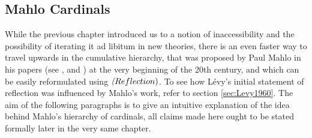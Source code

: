 \documentclass[12pt,a4paper]{article}
\newcommand{\power}[1]{\ensuremath{\mathscr{P}} (#1)}
\newcommand{\then}{\rightarrow}
\begin{document}
{\begin{comment}
Then $\langle$
 $V_ \alpha, \in, R  \cap V_\alpha \rangle \prec \langle V_{\kappa}, \in, R\rangle$ by the usual (Tarski) criterion for elementary substructure.
 \newline\newline
 The next part, proving $(iii) \then (ii)$, should be elementary since $C$ is closed unbounded, which means that it contains at least countably many elements but we need only one such $\alpha$ to satisfy (\ref{def:reflection_2}).
 \newline
 Finally, we shall prove that $(ii) \then (i)$. Since it obviously holds that $\kappa > \omega$, we have yet to prove that $\kappa$ is regular and a~strong limit. Let's argue by contradiction that it is regular. 
 If it wasn't, there would be a~$\beta < \kappa$ and a~function $F: \beta \implies \kappa$ with range unbounded in $\kappa$. Set $R = \{\beta\} \cup F$. By hypothesis there is an $\alpha < \kappa$ such that $\langle V_\alpha, \in, R \cap V_\alpha \rangle \prec \langle V_\kappa, \in, R \rangle$. Since $\beta$ is the single ordinal in R, $\beta \in V_\alpha$ by elementarity. This yields the desired contradiction since the domain if $F \cap V_\alpha$ cannot be all of $\beta$.
 \newline\newline
 Next, let's see whether $\kappa$ is indeed a~strong limit, again by contradiction. If not, there would be a~$\lambda < \kappa$ such that $2^\lambda \geq \kappa$. Let $G: \power{\lambda} \implies \kappa$ be surjective and set $R = \{\lambda + 1\} \cup G$. By hypothesis, there is an $\alpha < \kappa$ such that $\langle V_\alpha, \in, R \cap V_\alpha \rangle \prec \langle V_\kappa, \in, R \rangle$. $\lambda + 1 \in V_\alpha$ and so $\power{\lambda} \in V_\alpha$, but this is again a~contradiction.
\end{proof}

\

\end{comment}
}

%
%

\subsection{Mahlo Cardinals}

While the previous chapter introduced us to a notion of inaccessibility and the possibility of iterating it ad libitum in new theories, there is an even faster way to travel upwards in the cumulative hierarchy, that was proposed by Paul Mahlo in his papers (see \cite{Mahlo11}, \cite{Mahlo12} and \cite{Mahlo13}) at the very beginning of the 20th century, and which can be easily reformulated using $\emph(Reflection)$. To see how Lévy's initial statement of reflection was influenced by Mahlo's work, refer to section \ref{sec:Levy1960}. The aim of the following paragraphs is to give an intuitive explanation of the idea behind Mahlo's hierarchy of cardinals, all claims made here ought to be stated formally later in the very same chapter.
\end{document}
